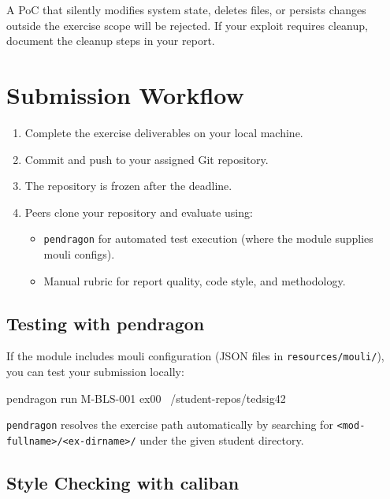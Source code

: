 \begin{warning}
  A PoC that silently modifies system state, deletes files, or
  persists changes outside the exercise scope will be rejected.
  If your exploit requires cleanup, document the cleanup steps
  in your report.
\end{warning}

\section{Submission Workflow}

\begin{enumerate}
  \item Complete the exercise deliverables on your local machine.
  \item Commit and push to your assigned Git repository.
  \item The repository is frozen after the deadline.
  \item Peers clone your repository and evaluate using:
        \begin{itemize}
          \item \texttt{pendragon} for automated test execution
                (where the module supplies mouli configs).
          \item Manual rubric for report quality, code style, and
                methodology.
        \end{itemize}
\end{enumerate}


\subsection*{Testing with pendragon}

If the module includes mouli configuration (JSON files in
\texttt{resources/mouli/}), you can test your submission locally:

\begin{console}
pendragon run M-BLS-001 ex00 ~/student-repos/tedsig42
\end{console}

\texttt{pendragon} resolves the exercise path automatically by
searching for \texttt{<mod-fullname>/<ex-dirname>/} under the
given student directory.

\subsection*{Style Checking with caliban}


